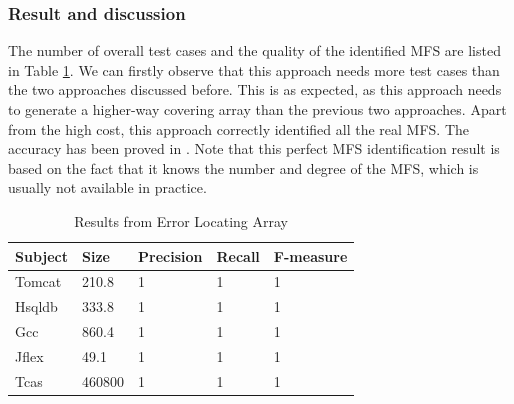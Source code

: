 \documentclass{sig-alternate}
\begin{document}




\subsubsection{Result and discussion}
The number of overall test cases and the quality of the identified MFS are listed in Table \ref{cm_ela}. We can firstly observe that this approach needs more test cases than the two approaches discussed before. This is as expected, as this approach needs to generate a higher-way covering array than the previous two approaches. Apart from the high cost, this approach correctly identified all the real MFS. The accuracy has been proved in \cite{martinez2008algorithms,martinez2009locating}.  Note that this perfect MFS identification result is based on the fact that it knows the number and degree of the MFS, which is usually not available in practice.


\begin{table}[htbp]
\center
\caption{Results from Error Locating Array}
\label{cm_ela}
\begin{tabular}{|l|llll|}
\hline
Subject & Size   & Precision & Recall & F-measure \\ \hline
Tomcat  & 210.8  & 1       & 1      & 1         \\
Hsqldb  & 333.8  & 1       & 1      & 1         \\
Gcc      & 860.4 & 1       & 1      & 1         \\
Jflex   & 49.1   & 1       & 1      & 1         \\
Tcas    & 460800 & 1       & 1      & 1         \\ \hline
\end{tabular}
\end{table}
\end{document}
